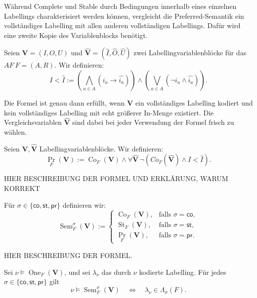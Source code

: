Während Complete und Stable durch Bedingungen innerhalb eines einzelnen
Labellings charakterisiert werden können, vergleicht die
Preferred-Semantik ein vollständiges Labelling mit allen anderen
vollständigen Labellings. Dafür wird eine zweite Kopie des
Variablenblocks benötigt.
\begin{Definition}
    \label{def:strict-inclusion}
    Seien \(\mathbf V=(I,O,U)\) und
    \(\widehat{\mathbf V}=(\widehat{I},\widehat{O},\widehat{U})\) zwei Labellingvariablenblöcke für das 
    \(AF ~F=(A,R)\). Wir definieren:
    \[
        I < \widehat{I}
        :=
        \left(
            \bigwedge_{a\in A}(i_a\rightarrow \widehat{i_a})
        \right)
        \land
        \left(
            \bigvee_{a\in A}(\neg i_a\land \widehat{i_a})
        \right).
    \]
\end{Definition}
Die Formel ist genau dann erfüllt, wenn \(\mathbf V\) ein vollständiges
Labelling kodiert und kein vollständiges Labelling mit echt größerer
In-Menge existiert. Die Vergleichsvariablen
\(\widehat{\mathbf V}\) sind dabei bei jeder Verwendung der Formel
frisch zu wählen.
\begin{Definition}
    \label{def:preferred-encoding}
    Seien \(\mathbf V, \widehat{\mathbf V}\) Labellingvariablenblöcke. Wir definieren:
    \[
        \operatorname{Pr}_F(\mathbf V)
        :=
        \operatorname{Co}_F(\mathbf V)
        \land
        \forall\widehat{\mathbf V}\,
        \neg ({Co}_F(\widehat{\mathbf V})
        \land I < \widehat{I}).
    \]
\end{Definition}
HIER BESCHREIBUNG DER FORMEL UND ERKLÄRUNG, WARUM KORREKT
\begin{Definition}
    \label{def:uniform-semantics-predicate}
    Für
    \(\sigma\in\{\mathsf{co},\mathsf{st},\mathsf{pr}\}\) definieren wir:
    \[
        \operatorname{Sem}^{\sigma}_F(\mathbf V)
        :=
        \begin{cases}
            \operatorname{Co}_F(\mathbf V),
                &\text{falls }\sigma=\mathsf{co},\\
            \operatorname{St}_F(\mathbf V),
                &\text{falls }\sigma=\mathsf{st},\\
            \operatorname{Pr}_F(\mathbf V),
                &\text{falls }\sigma=\mathsf{pr}.
        \end{cases}
    \]
\end{Definition}
HIER BESCHREIBUNG DER FORMEL.
\begin{Lemma}
    \label{lem:semantics-encoding-correct}
    Sei \(\nu\models\operatorname{One}_F(\mathbf V)\), und sei
    \(\lambda_\nu\) das durch \(\nu\) kodierte Labelling. Für jedes
    \(\sigma\in\{\mathsf{co},\mathsf{st},\mathsf{pr}\}\) gilt
    \[
        \nu\models\operatorname{Sem}^{\sigma}_F(\mathbf V)
        \quad\Longleftrightarrow\quad
        \lambda_\nu\in\Lambda_\sigma(F).
    \]
\end{Lemma}
